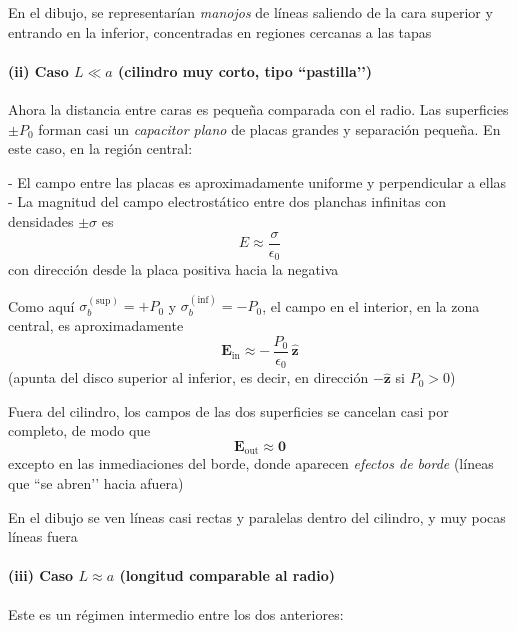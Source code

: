 \documentclass{article}
\begin{document}
En el dibujo, se representarían \emph{manojos} de líneas saliendo de la cara superior y entrando en la inferior, concentradas en regiones cercanas a las tapas

\paragraph{(ii) Caso $L \ll a$ (cilindro muy corto, tipo ``pastilla’’)}

Ahora la distancia entre caras es pequeña comparada con el radio. Las superficies $\pm P_{0}$ forman casi un \emph{capacitor plano} de placas grandes y separación pequeña. En este caso, en la región central:

- El campo entre las placas es aproximadamente uniforme y perpendicular a ellas  
- La magnitud del campo electrostático entre dos planchas infinitas con densidades $\pm\sigma$ es
  \begin{equation}
  E \approx \frac{\sigma}{\epsilon_{0}}
  \label{eq:E-capacitor}
  \end{equation}
  con dirección desde la placa positiva hacia la negativa

Como aquí $\sigma_{b}^{(\text{sup})} = +P_{0}$ y $\sigma_{b}^{(\text{inf})} = -P_{0}$, el campo en el interior, en la zona central, es aproximadamente
\begin{equation}
\mathbf{E}_{\text{in}} \approx -\,\frac{P_{0}}{\epsilon_{0}}\,\hat{\mathbf{z}}
\label{eq:E-interior-corto}
\end{equation}
(apunta del disco superior al inferior, es decir, en dirección $-\hat{\mathbf{z}}$ si $P_{0} > 0$)

Fuera del cilindro, los campos de las dos superficies se cancelan casi por completo, de modo que
\begin{equation}
\mathbf{E}_{\text{out}} \approx \mathbf{0}
\label{eq:E-exterior-corto}
\end{equation}
excepto en las inmediaciones del borde, donde aparecen \emph{efectos de borde} (líneas que ``se abren’’ hacia afuera)

En el dibujo se ven líneas casi rectas y paralelas dentro del cilindro, y muy pocas líneas fuera

\paragraph{(iii) Caso $L \approx a$ (longitud comparable al radio)}

Este es un régimen intermedio entre los dos anteriores:
\end{document}
